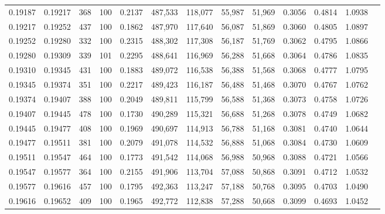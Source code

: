 \begin{tabular}{rrrrrrrrrrrrr}
0.19187 & 0.19217 &   368 & 100 &                                     0.2137 & 487,533 & 118,077 &  55,987 &  51,969 & 0.3056 & 0.4814 & 1.0938 \\
0.19217 & 0.19252 &   437 & 100 &                                     0.1862 & 487,970 & 117,640 &  56,087 &  51,869 & 0.3060 & 0.4805 & 1.0897 \\
0.19252 & 0.19280 &   332 & 100 &                                     0.2315 & 488,302 & 117,308 &  56,187 &  51,769 & 0.3062 & 0.4795 & 1.0866 \\
0.19280 & 0.19309 &   339 & 101 &                                     0.2295 & 488,641 & 116,969 &  56,288 &  51,668 & 0.3064 & 0.4786 & 1.0835 \\
0.19310 & 0.19345 &   431 & 100 &                                     0.1883 & 489,072 & 116,538 &  56,388 &  51,568 & 0.3068 & 0.4777 & 1.0795 \\
0.19345 & 0.19374 &   351 & 100 &                                     0.2217 & 489,423 & 116,187 &  56,488 &  51,468 & 0.3070 & 0.4767 & 1.0762 \\
0.19374 & 0.19407 &   388 & 100 &                                     0.2049 & 489,811 & 115,799 &  56,588 &  51,368 & 0.3073 & 0.4758 & 1.0726 \\
0.19407 & 0.19445 &   478 & 100 &                                     0.1730 & 490,289 & 115,321 &  56,688 &  51,268 & 0.3078 & 0.4749 & 1.0682 \\
0.19445 & 0.19477 &   408 & 100 &                                     0.1969 & 490,697 & 114,913 &  56,788 &  51,168 & 0.3081 & 0.4740 & 1.0644 \\
0.19477 & 0.19511 &   381 & 100 &                                     0.2079 & 491,078 & 114,532 &  56,888 &  51,068 & 0.3084 & 0.4730 & 1.0609 \\
0.19511 & 0.19547 &   464 & 100 &                                     0.1773 & 491,542 & 114,068 &  56,988 &  50,968 & 0.3088 & 0.4721 & 1.0566 \\
0.19547 & 0.19577 &   364 & 100 &                                     0.2155 & 491,906 & 113,704 &  57,088 &  50,868 & 0.3091 & 0.4712 & 1.0532 \\
0.19577 & 0.19616 &   457 & 100 &                                     0.1795 & 492,363 & 113,247 &  57,188 &  50,768 & 0.3095 & 0.4703 & 1.0490 \\
0.19616 & 0.19652 &   409 & 100 &                                     0.1965 & 492,772 & 112,838 &  57,288 &  50,668 & 0.3099 & 0.4693 & 1.0452 \\

\end{tabular}
